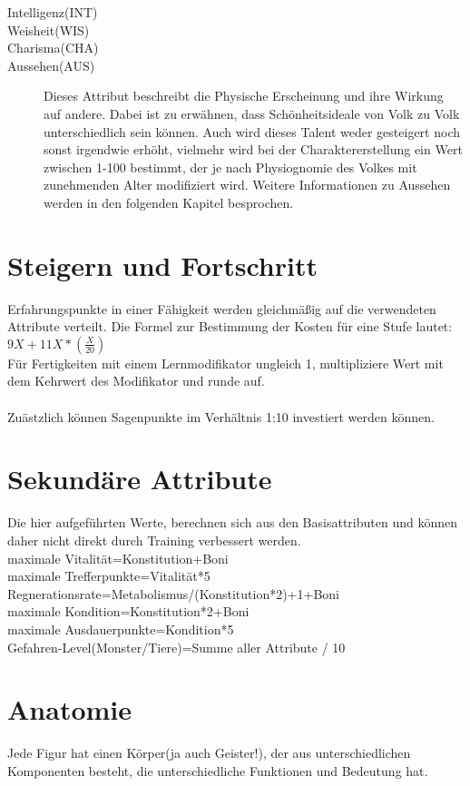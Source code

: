 \documentclass[a4paper,12pt,oneside]{book}
\begin{document}
\begin{description}
\item[Intelligenz(INT)]
\item[Weisheit(WIS)]
\item[Charisma(CHA)]
\item[Aussehen(AUS)]
Dieses Attribut beschreibt die Physische Erscheinung und ihre Wirkung auf andere. Dabei ist zu erwähnen, dass Schönheitsideale von Volk zu Volk unterschiedlich sein können. Auch wird dieses Talent weder gesteigert noch sonst irgendwie erhöht, vielmehr wird bei der Charaktererstellung ein Wert zwischen 1-100 bestimmt, der je nach Physiognomie des Volkes mit zunehmenden Alter modifiziert wird. Weitere Informationen zu Aussehen werden in den folgenden Kapitel besprochen.
\end{description}
\chapter{Steigern und Fortschritt}
Erfahrungspunkte in einer Fähigkeit werden gleichmäßig auf die verwendeten Attribute verteilt. Die Formel zur Bestimmung der Kosten für eine Stufe lautet:
\\$9X+11X*(\frac{X}{20})$
\\Für Fertigkeiten mit einem Lernmodifikator ungleich 1, multipliziere Wert mit dem Kehrwert des Modifikator und runde auf.
\\
\\Zuästzlich können Sagenpunkte im Verhältnis 1:10 investiert werden können.
\chapter{Sekundäre Attribute}
Die hier aufgeführten Werte, berechnen sich aus den Basisattributen und können daher nicht direkt durch Training verbessert werden.
\\maximale Vitalität=Konstitution+Boni
\\maximale Trefferpunkte=Vitalität*5
\\Regnerationsrate=Metabolismus/(Konstitution*2)+1+Boni
\\maximale Kondition=Konstitution*2+Boni
\\maximale Ausdauerpunkte=Kondition*5
\\Gefahren-Level(Monster/Tiere)=Summe aller Attribute / 10

\chapter{Anatomie}
Jede Figur hat einen Körper(ja auch Geister!), der aus unterschiedlichen Komponenten besteht, die unterschiedliche Funktionen und Bedeutung hat.
\end{document}
